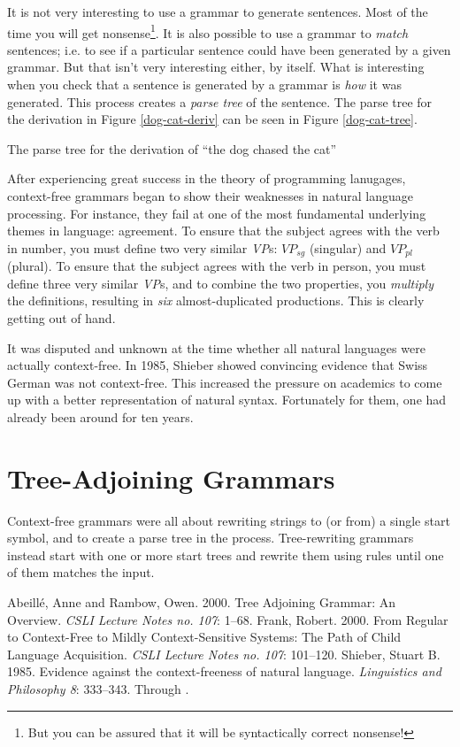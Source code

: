 \documentclass[12pt]{article}
\begin{document}
It is not very interesting to use a grammar to generate sentences.  Most
of the time you will get nonsense\footnote{But you can be assured that
it will be syntactically correct nonsense!}.  It is also possible to use
a grammar to \textit{match} sentences; i.e. to see if a particular
sentence could have been generated by a given grammar.   But that isn't
very interesting either, by itself.  What is interesting when you
check that a sentence is generated by a grammar is \textit{how} it was
generated.  This process creates a \textit{parse tree} of the sentence.
The parse tree for the derivation in Figure \ref{dog-cat-deriv} can be
seen in Figure \ref{dog-cat-tree}.

\begin{Figure}
\caption{The parse tree for the derivation of ``the dog chased the
cat''}
\label{dog-cat-tree}
\end{Figure}

After experiencing great success in the theory of programming lanugages,
context-free grammars began to show their weaknesses in natural language
processing.  For instance, they fail at one of the most fundamental
underlying themes in language: agreement.  To ensure that the subject
agrees with the verb in number, you must define two very similar
\textit{VP}s: $\mathit{VP}_\mathit{sg}$ (singular) and
$\mathit{VP}_\mathit{pl}$ (plural).  To ensure that the subject agrees
with the verb in person, you must define three very similar
\textit{VP}s, and to combine the two properties, you \textit{multiply}
the definitions, resulting in \textit{six} almost-duplicated
productions.  This is clearly getting out of hand.

It was disputed and unknown at the time whether all natural languages
were actually context-free.  In 1985, Shieber\cite{Shieber-1985} showed
convincing evidence that Swiss German was not context-free.  This
increased the pressure on academics to come up with a better
representation of natural syntax.  Fortunately for them, one had already
been around for ten years.

\section{Tree-Adjoining Grammars}

Context-free grammars were all about rewriting strings to (or from) a
single start symbol, and to create a parse tree in the process.
Tree-rewriting grammars instead start with one or more start trees and
rewrite them using rules until one of them matches the input.

\singlespace
\begin{thebibliography}{4in}
 Abeill\'e, Anne and Rambow, Owen.  2000.  Tree
Adjoining Grammar: An Overview.  \textit{CSLI Lecture Notes no. 107}:
1--68.
 Frank, Robert.  2000.  From Regular to Context-Free
to Mildly Context-Sensitive Systems: The Path of Child Language
Acquisition.  \textit{CSLI Lecture Notes no. 107}: 101--120.
 Shieber, Stuart B.  1985. Evidence against the
context-freeness of natural language.  \textit{Linguistics and
Philosophy 8}: 333--343.  Through \cite{Abeille-2000}.
\end{thebibliography}
\end{document}
